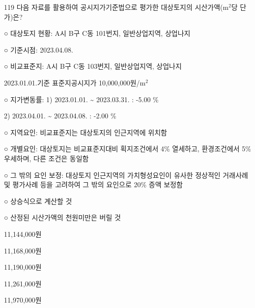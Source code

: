 \begin{question}{119}
다음 자료를 활용하여 공시지가기준법으로 평가한 대상토지의 시산가액(m$^2$당 단가)은?
\begin{framedtext}
○ 대상토지 현황: A시 B구 C동 101번지, 일반상업지역, 상업나지 \par
○ 기준시점: 2023.04.08. \par
○ 비교표준지: A시 B구 C동 103번지, 일반상업지역, 상업나지 \par
\hspace*{4.5em}2023.01.01.기준 표준지공시지가 10,000,000원/m$^2$ \par
○ 지가변동률: 1) 2023.01.01. \~{} 2023.03.31. : -5.00 \% \par
\hspace*{6.2em}2) 2023.04.01. \~{} 2023.04.08. : -2.00 \% \par
○ 지역요인: 비교표준지는 대상토지의 인근지역에 위치함 \par
○ 개별요인: 대상토지는 비교표준지대비 획지조건에서 4\% 열세하고, 환경조건에서 5\% 우세하며, 다른 조건은 동일함 \par
○ 그 밖의 요인 보정: 대상토지 인근지역의 가치형성요인이 유사한 정상적인 거래사례 및 평가사례 등을 고려하여 그 밖의 요인으로 20\% 증액 보정함 \par
○ 상승식으로 계산할 것 \par
○ 산정된 시산가액의 천원미만은 버릴 것 \par
\end{framedtext}
\begin{choices}
  \item 11,144,000원
  \item 11,168,000원
  \item 11,190,000원
  \item 11,261,000원
  \item 11,970,000원
\end{choices}
\end{question}
